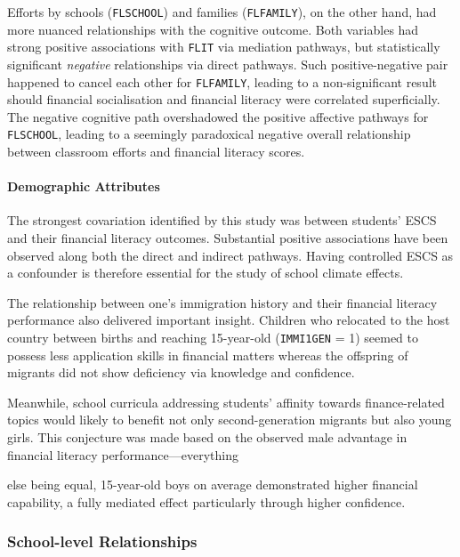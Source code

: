 Efforts by schools (\texttt{FLSCHOOL}) and families (\texttt{FLFAMILY}), on the other hand, had more nuanced relationships with the cognitive outcome. Both variables had strong positive associations with \texttt{FLIT} via mediation pathways, but statistically significant \emph{negative} relationships via direct pathways. Such positive-negative pair happened to cancel each other for \texttt{FLFAMILY}, leading to a non-significant result should financial socialisation and financial literacy were correlated superficially. The negative cognitive path overshadowed the positive affective pathways for \texttt{FLSCHOOL}, leading to a seemingly paradoxical negative overall relationship between classroom efforts and financial literacy scores.

\paragraph{Demographic Attributes}

The strongest covariation identified by this study was between students' ESCS and their financial literacy outcomes. Substantial positive associations have been observed along both the direct and indirect pathways. Having controlled ESCS as a confounder is therefore essential for the study of school climate effects.

The relationship between one's immigration history and their financial literacy performance also delivered important insight. Children who relocated to the host country between births and reaching 15-year-old (\texttt{IMMI1GEN} = 1) seemed to possess less application skills in financial matters whereas the offspring of migrants did not show deficiency via knowledge and confidence.

Meanwhile, school curricula addressing students' affinity towards finance-related topics would likely to benefit not only second-generation migrants but also young girls. This conjecture was made based on the observed male advantage in financial literacy performance---everything

%

%

\noindent else being equal, 15-year-old boys on average demonstrated higher financial capability, a fully mediated effect particularly through higher confidence.

%

\subsubsection{School-level Relationships}

